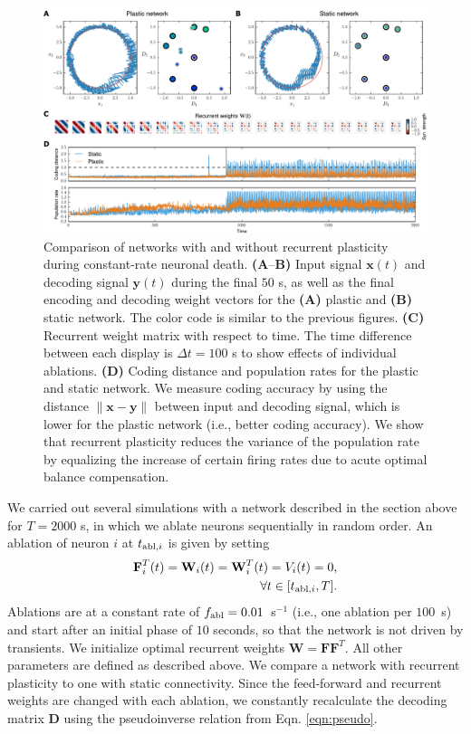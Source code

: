 \documentclass[twoside,twocolumn]{article}
\renewcommand{\b}[1]{\textbf{#1}}
\begin{document}
 \begin{figure}[!ht]
  \includegraphics[width=\textwidth]{../plots/Fig5.pdf}
  \caption{Comparison of networks with and without recurrent plasticity during constant-rate neuronal death. \textbf{(A}--\textbf{B)} Input signal $\b{x}(t)$ and decoding signal $\b{y}(t)$ during the final $50$ s, as well as the final encoding and decoding weight vectors for the \textbf{(A)} plastic and \textbf{(B)} static network. The color code is similar to the previous figures. \textbf{(C)} Recurrent weight matrix with respect to time. The time difference between each display is $\Delta t = 100$ s to show effects of individual ablations. \textbf{(D)} Coding distance and population rates for the plastic and static network. We measure coding accuracy by using the distance $\|\b{x}-\b{y}\|$ between input and decoding signal, which is lower for the plastic network (i.e., better coding accuracy). We show that recurrent plasticity reduces the variance of the population rate by equalizing the increase of certain firing rates due to acute optimal balance compensation.}
  \label{fig:recovery}
\end{figure}

We carried out several simulations with a network described in the section above for $T=2000$ s, in which we ablate neurons sequentially in random order. An ablation of neuron $i$ at $t_{\textnormal{abl},i}$ is given by setting
\begin{align}
\b{F}^T_i (t) = \b{W}_i (t)= \b{W}^T_i(t) = V_i (t) = 0, \nonumber\\
 \forall t \in [t_{\textnormal{abl},i},T]. 
\end{align} 
Ablations are at a constant rate of $f_{\textnormal{abl}}=0.01$~s$^{-1}$ (i.e., one ablation per $100$~s) and start after an initial phase of $10$ seconds, so that the network is not driven by transients. We initialize optimal recurrent weights $\b{W}=\b{F}\b{F}^T$. All other parameters are defined as described above. We compare a network with recurrent plasticity to one with static connectivity. Since the feed-forward and recurrent weights are changed with each ablation, we constantly recalculate the decoding matrix $\b{D}$ using the pseudoinverse relation from Eqn. \ref{eqn:pseudo}. 
\end{document}
